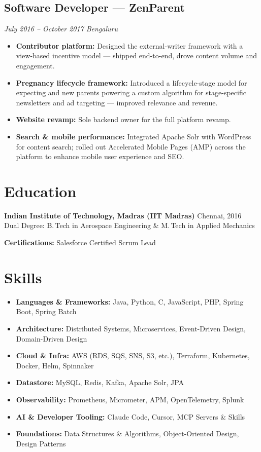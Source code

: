 \documentclass[10pt,a4paper]{article}
\newcommand{\role}[4]{%
    \subsection*{#1 \textnormal{---} #2}%
    \vspace{-4pt}%
    {\color{muted}\textit{#3 \textbar{} #4}}%
    \vspace{2pt}%
}
\newcommand{\tag}[1]{\textbf{#1:}}
\begin{document}
\role{Software Developer}{ZenParent}{July 2016 -- October 2017}{Bengaluru}
\begin{itemize}
    \item \tag{Contributor platform} Designed the external-writer framework with a view-based incentive model --- shipped end-to-end, drove content volume and engagement.
    \item \tag{Pregnancy lifecycle framework} Introduced a lifecycle-stage model for expecting and new parents powering a custom algorithm for stage-specific newsletters and ad targeting --- improved relevance and revenue.
    \item \tag{Website revamp} Sole backend owner for the full platform revamp.
    \item \tag{Search \& mobile performance} Integrated Apache Solr with WordPress for content search; rolled out Accelerated Mobile Pages (AMP) across the platform to enhance mobile user experience and SEO.
\end{itemize}

\section*{Education}
\textbf{Indian Institute of Technology, Madras (IIT Madras)} \hfill Chennai, 2016\\
Dual Degree: B.\,Tech in Aerospace Engineering \& M.\,Tech in Applied Mechanics

\textbf{Certifications:} Salesforce Certified Scrum Lead


\section*{Skills}
\begin{itemize}[leftmargin=1.2em, itemsep=1pt]
    \item \tag{Languages \& Frameworks} Java, Python, C, JavaScript, PHP, Spring Boot, Spring Batch
    \item \tag{Architecture} Distributed Systems, Microservices, Event-Driven Design, Domain-Driven Design
    \item \tag{Cloud \& Infra} AWS (RDS, SQS, SNS, S3, etc.), Terraform, Kubernetes, Docker, Helm, Spinnaker
    \item \tag{Datastore} MySQL, Redis, Kafka, Apache Solr, JPA
    \item \tag{Observability} Prometheus, Micrometer, APM, OpenTelemetry, Splunk
    \item \tag{AI \& Developer Tooling} Claude Code, Cursor, MCP Servers \& Skills
    \item \tag{Foundations} Data Structures \& Algorithms, Object-Oriented Design, Design Patterns
\end{itemize}
\end{document}
